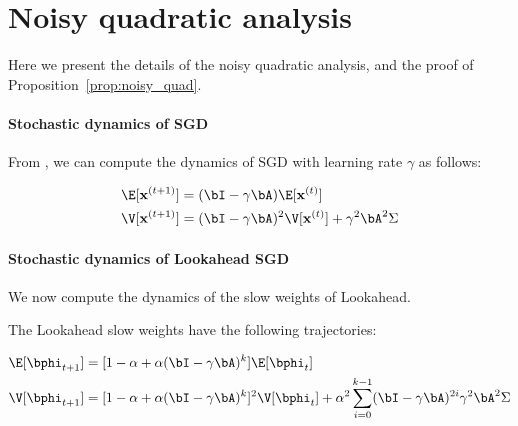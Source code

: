 \section{Noisy quadratic analysis}
\label{app:noisy}
Here we present the details of the noisy quadratic analysis, and the proof of Proposition~\ref{prop:noisy_quad}.

\paragraph{Stochastic dynamics of SGD} From \citet{wu2018understanding}, we can compute the dynamics of SGD with learning rate $\gamma$ as follows:

\begin{align}
    \E[\bx^{(t+1)}] &= (\bI - \gamma \bA) \E[\bx^{(t)}] \\
    \V[\bx^{(t+1)}] &= (\bI - \gamma \bA)^2\V[\bx^{(t)}] + \gamma^2 \bA^2 \Sigma
\end{align}

\paragraph{Stochastic dynamics of Lookahead SGD} We now compute the dynamics of the slow weights of Lookahead.

\begin{lemma}The Lookahead slow weights have the following trajectories:

\begin{align}
    \E[\bphi_{t+1}] &= [1 - \alpha + \alpha (\bI - \gamma \bA)^k] \E[\bphi_{t}] \\
    \V[\bphi_{t+1}] &= [1-\alpha + \alpha (\bI - \gamma \bA)^k]^2\V[\bphi_t] + \alpha^2 \sum_{i=0}^{k-1} (\bI - \gamma \bA)^{2i}\gamma^2\bA^2\Sigma 
\end{align}
\end{lemma}

